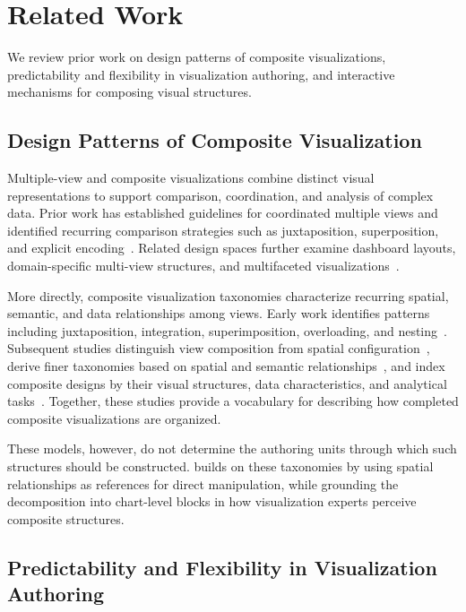 
\section{Related Work}

We review prior work on design patterns of composite visualizations,
predictability and flexibility in visualization authoring, and interactive
mechanisms for composing visual structures.


\subsection{Design Patterns of Composite Visualization}



Multiple-view and composite visualizations combine distinct visual
representations to support comparison, coordination, and analysis of complex
data. Prior work has established guidelines for coordinated multiple views and
identified recurring comparison strategies such as juxtaposition,
superposition, and explicit encoding~\cite{GuidelinesMultipleViews,
CoordinatedMultipleViews,VisualComparison}. Related design spaces further
examine dashboard layouts, domain-specific multi-view structures, and
multifaceted visualizations~\cite{DashboardDesignSpace,
MultiViewDesignPatterns,MultiFacetedGraph}.

More directly, composite visualization taxonomies characterize recurring
spatial, semantic, and data relationships among views. Early work identifies
patterns including juxtaposition, integration, superimposition, overloading,
and nesting~\cite{javed2012exploring}. Subsequent studies distinguish view
composition from spatial configuration~\cite{Composite}, derive finer
taxonomies based on spatial and semantic relationships~\cite{deng2023survey},
and index composite designs by their visual structures, data characteristics,
and analytical tasks~\cite{vaid}. Together, these studies provide a vocabulary
for describing how completed composite visualizations are organized.

These models, however, do not determine the authoring units through which such
structures should be constructed. {\system} builds on these taxonomies by
using spatial relationships as references for direct manipulation, while
grounding the decomposition into chart-level blocks in how visualization
experts perceive composite structures.


\subsection{Predictability and Flexibility in Visualization Authoring}
\label{sec:related-authoring-granularity}

